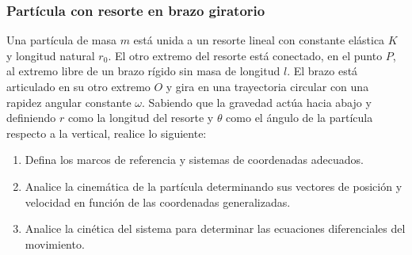 \subsubsection{Partícula con resorte en brazo giratorio}

Una partícula de masa $m$ está unida a un resorte lineal con constante elástica $K$ y longitud natural $r_0$. El otro extremo del resorte está conectado, en el punto $P$, al extremo libre de un brazo rígido sin masa de longitud $l$. El brazo está articulado en su otro extremo $O$ y gira en una trayectoria circular con una rapidez angular constante $\omega$. Sabiendo que la gravedad actúa hacia abajo y definiendo $r$ como la longitud del resorte y $\theta$ como el ángulo de la partícula respecto a la vertical, realice lo siguiente:

\begin{enumerate}
    \item Defina los marcos de referencia y sistemas de coordenadas adecuados.
    \item Analice la cinemática de la partícula determinando sus vectores de posición y velocidad en función de las coordenadas generalizadas.
    \item Analice la cinética del sistema para determinar las ecuaciones diferenciales del movimiento.
\end{enumerate}

